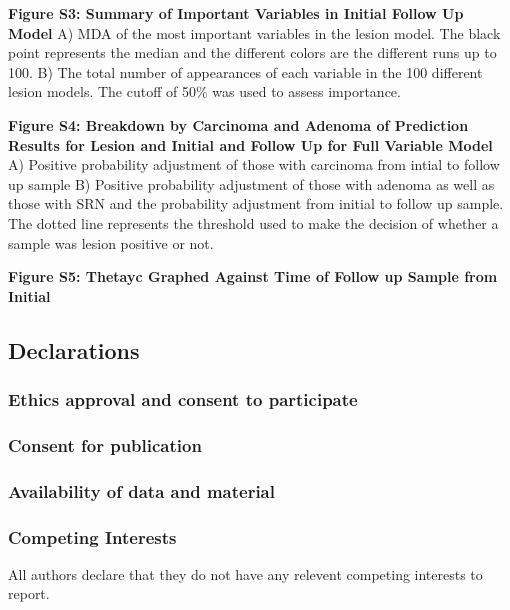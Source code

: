 \documentclass[12pt,]{article}
\begin{document}
\textbf{Figure S3: Summary of Important Variables in Initial Follow Up
Model} A) MDA of the most important variables in the lesion model. The
black point represents the median and the different colors are the
different runs up to 100. B) The total number of appearances of each
variable in the 100 different lesion models. The cutoff of 50\% was used
to assess importance.

\textbf{Figure S4: Breakdown by Carcinoma and Adenoma of Prediction
Results for Lesion and Initial and Follow Up for Full Variable Model} A)
Positive probability adjustment of those with carcinoma from intial to
follow up sample B) Positive probability adjustment of those with
adenoma as well as those with SRN and the probability adjustment from
initial to follow up sample. The dotted line represents the threshold
used to make the decision of whether a sample was lesion positive or
not.

\textbf{Figure S5: Thetayc Graphed Against Time of Follow up Sample from
Initial}

\newpage

\subsection{Declarations}\label{declarations}

\subsubsection{Ethics approval and consent to
participate}\label{ethics-approval-and-consent-to-participate}

\subsubsection{Consent for publication}\label{consent-for-publication}

\subsubsection{Availability of data and
material}\label{availability-of-data-and-material}

\subsubsection{Competing Interests}\label{competing-interests}

All authors declare that they do not have any relevent competing
interests to report.
\end{document}
